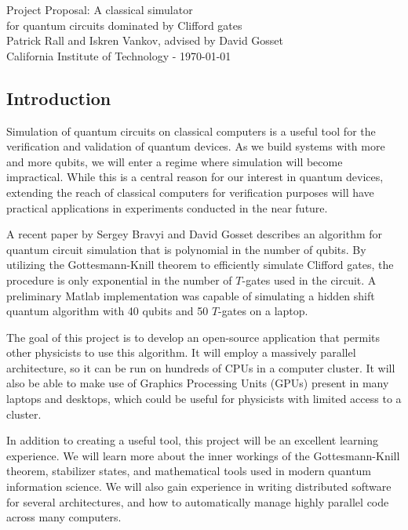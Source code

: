 \documentclass[11pt]{article}
\begin{document}
\begin{center}
    {\LARGE Project Proposal: A classical simulator\\ for quantum circuits dominated by Clifford gates }
\vspace{2mm}
{\large \\ Patrick Rall and Iskren Vankov, advised by David Gosset \\ California Institute of Technology -  \today}
\end{center}

\newenvironment{Figure}
  {\par\medskip\noindent\minipage{\linewidth}}
  {\endminipage\par\medskip}


\begin{multicols}{2}

\subsection*{Introduction}
Simulation of quantum circuits on classical computers is a useful tool for the verification and validation of quantum devices. As we build systems with more and more qubits, we will enter a regime where simulation will become impractical. While this is a central reason for our interest in quantum devices, extending the reach of classical computers for verification purposes will have practical applications in experiments conducted in the near future.

A recent paper by Sergey Bravyi and David Gosset \cite{bravyi-gosset} describes an algorithm for quantum circuit simulation that is polynomial in the number of qubits. By utilizing the Gottesmann-Knill theorem to efficiently simulate Clifford gates, the procedure is only exponential in the number of $T$-gates used in the circuit. A preliminary Matlab implementation was capable of simulating a hidden shift quantum algorithm with 40 qubits and 50 $T$-gates on a laptop.

The goal of this project is to develop an open-source application that permits other physicists to use this algorithm. It will employ a massively parallel architecture, so it can be run on hundreds of CPUs in a computer cluster. It will also be able to make use of Graphics Processing Units (GPUs) present in many laptops and desktops, which could be useful for physicists with limited access to a cluster. 

In addition to creating a useful tool, this project will be an excellent learning experience. We will learn more about the inner workings of the Gottesmann-Knill theorem, stabilizer states, and mathematical tools used in modern quantum information science. We will also gain experience in writing distributed software for several architectures, and how to automatically manage highly parallel code across many computers. 



\end{multicols}
\end{document}

